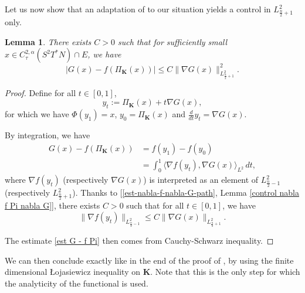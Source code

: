\documentclass[a4paper,11pt,reqno]{amsart}
\newtheorem{lemma}[defn]{Lemma}
\numberwithin{equation}{section}
\begin{document}
	Let us now show that an adaptation of \cite[Lemma 7.15]{Col-Min-Ein-Tan-Con} to our situation yields a control in $L^2_{\frac{n}{2}+1}$ only. 
	
	\begin{lemma}\label{loja orth noyau 1}
		There exists $C>0$ such that for sufficiently small $x\in C^{2,\alpha}_{\tau}(S^2T^*N)\cap E$, we have
		\begin{equation}
		|G(x)-f(\Pi_\mathbf{K}(x))|\leq C \|\nabla G(x)\|_{L^2_{\frac{n}{2}+1}}^2.\label{est G - f Pi}
		\end{equation}
	\end{lemma}
	\begin{proof}
		Define for all $t\in [0,1]$, 
		$$y_t:= \Pi_\mathbf{K}(x) + t\nabla G(x),$$
		for which we have $\Phi(y_1) = x$, $y_0 = \Pi_\mathbf{K}(x)$ and $\frac{d}{dt}y_t =\nabla G(x)$.
		
		
		By integration, we have
		\begin{align}
		G(x)-f(\Pi_\mathbf{K}(x)) &= f(y_1)-f(y_0) \nonumber\\
		&= \int_0^1 \langle \nabla f(y_t) , \nabla G(x) \rangle_{L^2} \,dt,\label{difference-G-fPi}
		\end{align}
		where $\nabla f(y_t)$ (respectively $\nabla G(x)$) is interpreted as an element of $L^2_{\frac{n}{2}-1}$ (respectively $L^2_{\frac{n}{2}+1}$). Thanks to [\eqref{est-nabla-f-nabla-G-path}, Lemma \ref{control nabla f Pi nabla G}], there exists $C>0$ such that for all $t\in[0,1]$, we have 
		\begin{equation*}
		\|\nabla f (y_t) \|_{L^2_{\frac{n}{2}-1}}\leq C \|\nabla G(x) \|_{L^2_{\frac{n}{2}+1}}.
		\end{equation*}
			
			
			The estimate \eqref{est G - f Pi} then comes from Cauchy-Schwarz inequality.
	\end{proof}
	
	We can then conclude exactly like in the end of the proof of \cite[Theorem 7.3]{Col-Min-Ein-Tan-Con}, by using the finite dimensional \L{}ojasiewicz inequality on $\mathbf{K}$. Note that this is the only step for which the analyticity of the functional is used.
	
\end{document}
